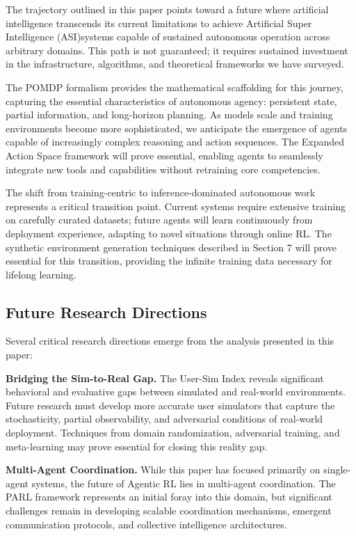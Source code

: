 The trajectory outlined in this paper points toward a future where artificial intelligence transcends its current limitations to achieve Artificial Super Intelligence (ASI)systems capable of sustained autonomous operation across arbitrary domains. This path is not guaranteed; it requires sustained investment in the infrastructure, algorithms, and theoretical frameworks we have surveyed.

The POMDP formalism provides the mathematical scaffolding for this journey, capturing the essential characteristics of autonomous agency: persistent state, partial information, and long-horizon planning. As models scale and training environments become more sophisticated, we anticipate the emergence of agents capable of increasingly complex reasoning and action sequences. The Expanded Action Space framework will prove essential, enabling agents to seamlessly integrate new tools and capabilities without retraining core competencies.

The shift from training-centric to inference-dominated autonomous work represents a critical transition point. Current systems require extensive training on carefully curated datasets; future agents will learn continuously from deployment experience, adapting to novel situations through online RL. The synthetic environment generation techniques described in Section 7 will prove essential for this transition, providing the infinite training data necessary for lifelong learning.

\subsection{Future Research Directions}

Several critical research directions emerge from the analysis presented in this paper:

\textbf{Bridging the Sim-to-Real Gap.} The User-Sim Index reveals significant behavioral and evaluative gaps between simulated and real-world environments. Future research must develop more accurate user simulators that capture the stochasticity, partial observability, and adversarial conditions of real-world deployment. Techniques from domain randomization, adversarial training, and meta-learning may prove essential for closing this reality gap.

\textbf{Multi-Agent Coordination.} While this paper has focused primarily on single-agent systems, the future of Agentic RL lies in multi-agent coordination. The PARL framework represents an initial foray into this domain, but significant challenges remain in developing scalable coordination mechanisms, emergent communication protocols, and collective intelligence architectures.

